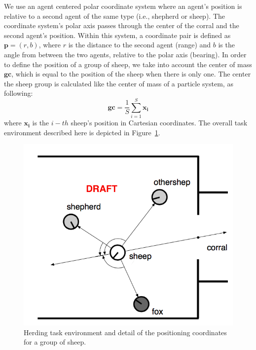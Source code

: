 \documentclass[conference]{IEEEtran}
\begin{document}
We use an agent centered polar coordinate system where an agent's position is relative to a second agent of the same type (i.e., shepherd or sheep).
The coordinate system's polar axis passes through the center of the corral and the second agent's position. 
Within this system, a coordinate pair is defined as $\mathbf{p} = (r, b)$, where $r$ is the distance to the second agent (range) and $b$ is the angle from between the two agents, relative to the polar axis (bearing).
In order to define the position of a group of sheep, we take into account the center of mass $\mathbf{gc}$, which is equal to the position of the sheep when there is only one.
The center the sheep group is calculated like the center of mass of a particle system, as following:
\begin{equation} \label{eq:gc}
\mathbf{gc} = \frac{1}{S} \sum_{i=1}^{S}{\mathbf{x_i}}
\end{equation}
where $\mathbf{x_i}$ is the $i-th$ sheep's position in Cartesian coordinates.
The overall task environment described here is depicted in Figure~\ref{fig:task_env}. 

\begin{figure}[ht]
	\centering
	\includegraphics[width=0.8\hsize]{imgs/herding_environment.png}
	\caption{Herding task environment and detail of the positioning coordinates for a group of sheep.}
	\label{fig:task_env}
\end{figure}
\end{document}
